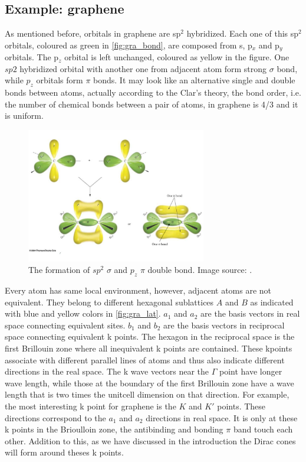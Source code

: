 \subsection{Example: graphene}

As mentioned before, orbitals in graphene are sp$^2$ hybridized. Each one of this sp$^2$ orbitals, coloured as green in \autoref{fig:gra_bond}, are composed from s, p$_x$ and p$_y$ orbitals. The p$_z$ orbital is left unchanged, coloured as yellow in the figure. One $sp2$ hybridized orbital with another one from adjacent atom form strong $\sigma$ bond, while $p_z$ orbitals form $\pi$ bonds. It may look like an alternative single and double bonds between atoms, actually according to the Clar's theory, the bond order, i.e. the number of chemical bonds between a pair of atoms, in graphene is 4/3 and it is uniform\cite{Wassmann2010}. 

\begin{figure}[htbp!] 
\centering  
\includegraphics[width=0.7\textwidth]{double_bond}
\caption{The formation of $sp^2$ $\sigma$ and $p_z$ $\pi$ double bond. Image source: \cite{gra_bond}. }  
\label{fig:gra_bond}
\end{figure} 

Every atom has same local environment, however, adjacent atoms are not equivalent. They belong to different hexagonal sublattices $A$ and $B$ as indicated with blue and yellow colors in \autoref{fig:gra_lat}. $a_1$ and $a_2$ are the basis vectors in real space connecting equivalent sites. $b_1$ and $b_2$ are the basis vectors in reciprocal space connecting equivalent k points. The hexagon in the reciprocal space is the first Brillouin zone where all inequivalent k points are contained. These kpoints associate with different parallel lines of atoms and thus also indicate different directions in the real space. The k wave vectors near the $\Gamma$ point have longer wave length, while those at the boundary of the first Brillouin zone have a wave length that is two times the unitcell dimension on that direction. For example, the most interesting k point for graphene is the $K$ and $K'$ points. These directions correspond to the $a_1$ and $a_2$ directions in real space. It is only at these k points in the Brioulloin zone, the antibinding and bonding $\pi$ band touch each other. Addition to this, as we have discussed in the introduction the Dirac cones will form around theses k points. 

